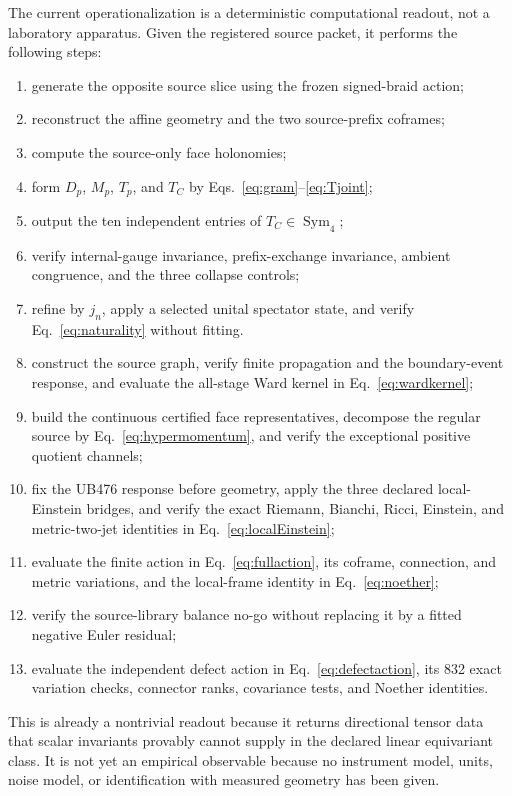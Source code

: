 \documentclass[11pt]{article}
\theoremstyle{definition}
\theoremstyle{remark}
\newcommand{\Sym}{\operatorname{Sym}}
\begin{document}
The current operationalization is a deterministic computational readout, not a laboratory apparatus. Given the registered source packet, it performs the following steps:
\begin{enumerate}
\item generate the opposite source slice using the frozen signed-braid action;
\item reconstruct the affine geometry and the two source-prefix coframes;
\item compute the source-only face holonomies;
\item form $D_p$, $M_p$, $T_p$, and $T_C$ by Eqs.~\eqref{eq:gram}--\eqref{eq:Tjoint};
\item output the ten independent entries of $T_C\in\Sym_4$;
\item verify internal-gauge invariance, prefix-exchange invariance, ambient congruence, and the three collapse controls;
\item refine by $j_n$, apply a selected unital spectator state, and verify Eq.~\eqref{eq:naturality} without fitting.
\item construct the source graph, verify finite propagation and the boundary-event response, and evaluate the all-stage Ward kernel in Eq.~\eqref{eq:wardkernel};
\item build the continuous certified face representatives, decompose the regular source by Eq.~\eqref{eq:hypermomentum}, and verify the exceptional positive quotient channels;
\item fix the UB476 response before geometry, apply the three declared local-Einstein bridges, and verify the exact Riemann, Bianchi, Ricci, Einstein, and metric-two-jet identities in Eq.~\eqref{eq:localEinstein};
\item evaluate the finite action in Eq.~\eqref{eq:fullaction}, its coframe, connection, and metric variations, and the local-frame identity in Eq.~\eqref{eq:noether};
\item verify the source-library balance no-go without replacing it by a fitted negative Euler residual;
\item evaluate the independent defect action in Eq.~\eqref{eq:defectaction}, its 832 exact variation checks, connector ranks, covariance tests, and Noether identities.
\end{enumerate}

This is already a nontrivial readout because it returns directional tensor data that scalar invariants provably cannot supply in the declared linear equivariant class. It is not yet an empirical observable because no instrument model, units, noise model, or identification with measured geometry has been given.
\end{document}
